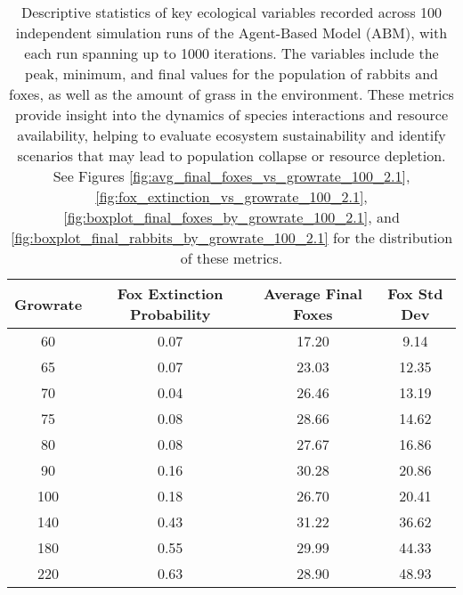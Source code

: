 \begin{table}[h!]
    \centering
    \begin{tabular}{|c|c|c|c|}
    \hline
    \textbf{Growrate} & \textbf{Fox Extinction Probability} & \textbf{Average Final Foxes} & \textbf{Fox Std Dev} \\
    \hline
    60 & 0.07 & 17.20 & 9.14 \\
    65 & 0.07 & 23.03 & 12.35 \\
    70 & 0.04 & 26.46 & 13.19 \\
    75 & 0.08 & 28.66 & 14.62 \\
    80 & 0.08 & 27.67 & 16.86 \\
    90 & 0.16 & 30.28 & 20.86 \\
    100 & 0.18 & 26.70 & 20.41 \\
    140 & 0.43 & 31.22 & 36.62 \\
    180 & 0.55 & 29.99 & 44.33 \\
    220 & 0.63 & 28.90 & 48.93 \\
    \hline
    \end{tabular}
    \caption{
        Descriptive statistics of key ecological variables recorded across 100 independent simulation runs of the Agent-Based Model (ABM), with each run spanning up to 1000 iterations. The variables include the peak, minimum, and final values for the population of rabbits and foxes, as well as the amount of grass in the environment. These metrics provide insight into the dynamics of species interactions and resource availability, helping to evaluate ecosystem sustainability and identify scenarios that may lead to population collapse or resource depletion. See Figures \ref{fig:avg_final_foxes_vs_growrate_100_2.1}, \ref{fig:fox_extinction_vs_growrate_100_2.1},
         \ref{fig:boxplot_final_foxes_by_growrate_100_2.1}, and \ref{fig:boxplot_final_rabbits_by_growrate_100_2.1} for the distribution of these metrics.
    }
    \label{tab:simulation_stats_2.1}
\end{table}
